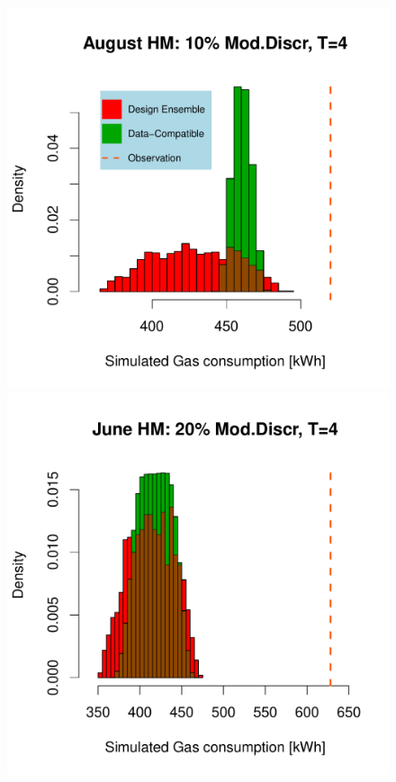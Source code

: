 \documentclass[a4paper, 12pt]{article}
\begin{document}
\begin{figure}
 \includegraphics[width=\scale]{Simulation_histograms/HM_Jun-Aug/August_HM_10MD}\\
 \includegraphics[width=\scale]{Simulation_histograms/HM_Jun-Aug/June_HM_20MD}

\end{figure}
\end{document}
